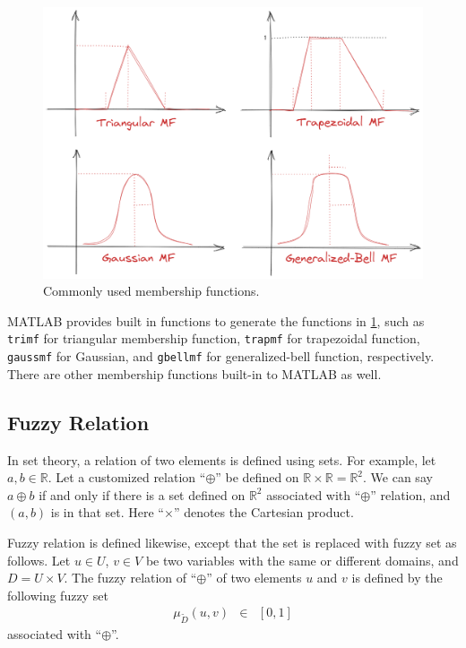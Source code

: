 \begin{figure}
	\centering
	\includegraphics[width=350pt]{chapters/ch-fuzzy-control-system/figures/commonmf.png}
	\caption{Commonly used membership functions.} \label{ch:fcs:fig:commonmf}
\end{figure}

MATLAB provides built in functions to generate the functions in \ref{ch:fcs:fig:commonmf}, such as \verb|trimf| for triangular membership function, \verb|trapmf| for trapezoidal function, \verb|gaussmf| for Gaussian, and \verb|gbellmf| for generalized-bell function, respectively. There are other membership functions built-in to MATLAB as well.

\subsection{Fuzzy Relation}

In set theory, a relation of two elements is defined using sets. For example, let $a, b \in \mathbb{R}$. Let a customized relation ``$\oplus$'' be defined on $\mathbb{R} \times \mathbb{R} = \mathbb{R}^2$. We can say $a \oplus b$ if and only if there is a set defined on $\mathbb{R}^2$ associated with ``$\oplus$'' relation, and $(a,b)$ is in that set. Here ``$\times$'' denotes the Cartesian product.

Fuzzy relation is defined likewise, except that the set is replaced with fuzzy set as follows. Let $u\in U$, $v \in V$ be two variables with the same or different domains, and $D=U \times V$. The fuzzy relation of ``$\oplus$'' of two elements $u$ and $v$ is defined by the following fuzzy set
\begin{eqnarray}
	\mu_{\utilde{D}} (u,v) &\in& [0, 1] \nonumber
\end{eqnarray}
associated with ``$\oplus$''.

